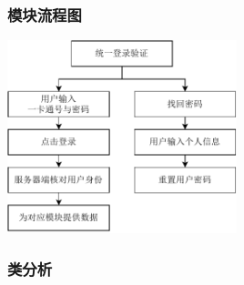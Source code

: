 \documentclass{article}
\begin{document}
\subsubsection{模块流程图}

\begin{center}
\includegraphics[width=0.5\textwidth]{fig/uni-login-flowchart.pdf}
\end{center}

\newpage

\subsubsection{类分析}
\end{document}
